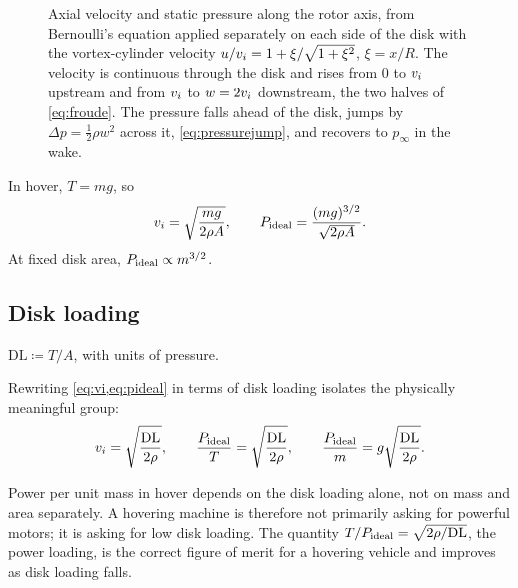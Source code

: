 \begin{figure}[tbp]
\centering

\caption{Axial velocity and static pressure along the rotor axis, from
Bernoulli's equation applied separately on each side of the disk with the
vortex-cylinder velocity $u/v_i = 1 + \xi/\sqrt{1+\xi^2}$, $\xi = x/R$. The
velocity is continuous through the disk and rises from $0$ to $v_i$
upstream and from $v_i$ to $w = 2v_i$ downstream, the two halves of
\cref{eq:froude}. The pressure falls ahead of the disk, jumps by
$\Delta p = \tfrac12\rho w^2$ across it, \cref{eq:pressurejump}, and recovers
to $p_\infty$ in the wake.}
\label{fig:axisprofile}
\end{figure}

\begin{corollary}[Hover]
\label{cor:hover}
In hover, $T = mg$, so
\begin{equation}
  v_i = \sqrt{\frac{mg}{2\rho A}},
  \qquad
  P_{\mathrm{ideal}} = \frac{(mg)^{3/2}}{\sqrt{2\rho A}} .
  \label{eq:hoverpower}
\end{equation}
At fixed disk area, $P_{\mathrm{ideal}} \propto m^{3/2}$.
\end{corollary}

\subsection{Disk loading}

\begin{definition}
$\mathrm{DL} \coloneqq T/A$, with units of pressure.
\end{definition}

Rewriting \cref{eq:vi,eq:pideal} in terms of disk loading isolates the
physically meaningful group:
\begin{equation}
  v_i = \sqrt{\frac{\mathrm{DL}}{2\rho}},
  \qquad
  \frac{P_{\mathrm{ideal}}}{T} = \sqrt{\frac{\mathrm{DL}}{2\rho}} ,
  \qquad
  \frac{P_{\mathrm{ideal}}}{m} = g\sqrt{\frac{\mathrm{DL}}{2\rho}} .
  \label{eq:dl}
\end{equation}

\begin{observation}
\label{obs:dl}
Power per unit mass in hover depends on the disk loading alone, not on mass and
area separately. A hovering machine is therefore not primarily asking for
powerful motors; it is asking for low disk loading. The quantity
$T/P_{\mathrm{ideal}} = \sqrt{2\rho/\mathrm{DL}}$, the power loading, is the correct
figure of merit for a hovering vehicle and improves as disk loading falls.
\end{observation}

